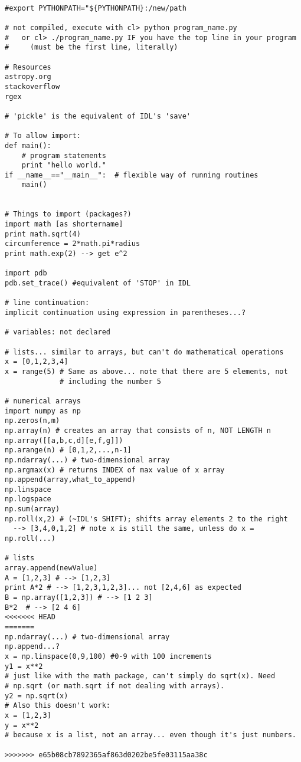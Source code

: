 \documentclass{article}
\begin{document}
\begin{verbatim}

#export PYTHONPATH="${PYTHONPATH}:/new/path

# not compiled, execute with cl> python program_name.py
#   or cl> ./program_name.py IF you have the top line in your program
#     (must be the first line, literally)

# Resources
astropy.org
stackoverflow
rgex

# 'pickle' is the equivalent of IDL's 'save'

# To allow import:
def main():
    # program statements
    print "hello world."
if __name__=="__main__":  # flexible way of running routines
    main()


# Things to import (packages?)
import math [as shortername]
print math.sqrt(4)
circumference = 2*math.pi*radius
print math.exp(2) --> get e^2

import pdb
pdb.set_trace() #equivalent of 'STOP' in IDL

# line continuation:
implicit continuation using expression in parentheses...?

# variables: not declared

# lists... similar to arrays, but can't do mathematical operations
x = [0,1,2,3,4]
x = range(5) # Same as above... note that there are 5 elements, not
             # including the number 5

# numerical arrays
import numpy as np
np.zeros(n,m)
np.array(n) # creates an array that consists of n, NOT LENGTH n
np.array([[a,b,c,d][e,f,g]])
np.arange(n) # [0,1,2,...,n-1]
np.ndarray(...) # two-dimensional array
np.argmax(x) # returns INDEX of max value of x array
np.append(array,what_to_append)
np.linspace
np.logspace
np.sum(array)
np.roll(x,2) # (~IDL's SHIFT); shifts array elements 2 to the right
  --> [3,4,0,1,2] # note x is still the same, unless do x = np.roll(...)

# lists
array.append(newValue)
A = [1,2,3] # --> [1,2,3]
print A*2 # --> [1,2,3,1,2,3]... not [2,4,6] as expected
B = np.array([1,2,3]) # --> [1 2 3]
B*2  # --> [2 4 6]
<<<<<<< HEAD
=======
np.ndarray(...) # two-dimensional array
np.append...?
x = np.linspace(0,9,100) #0-9 with 100 increments
y1 = x**2
# just like with the math package, can't simply do sqrt(x). Need
# np.sqrt (or math.sqrt if not dealing with arrays).
y2 = np.sqrt(x)
# Also this doesn't work:
x = [1,2,3]
y = x**2
# because x is a list, not an array... even though it's just numbers.

>>>>>>> e65b08cb7892365af863d0202be5fe03115aa38c


\end{verbatim}
\end{document}
